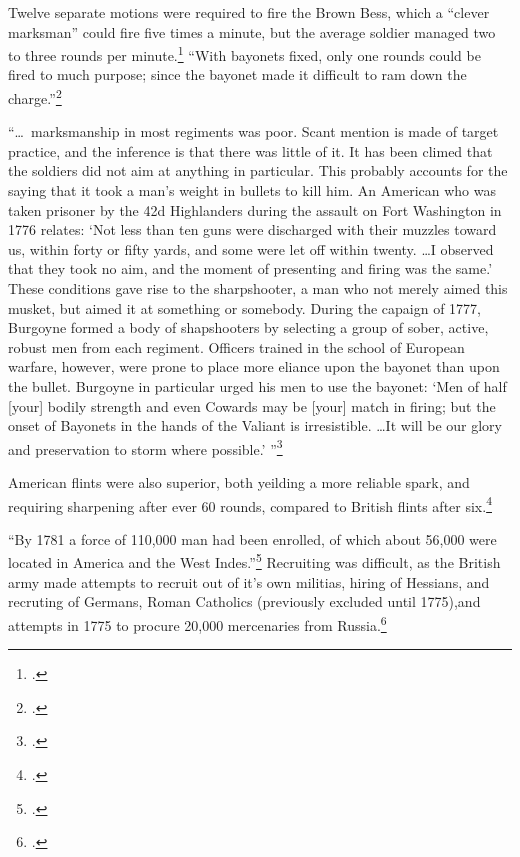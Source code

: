 Twelve separate motions were required to fire the Brown Bess, which a ``clever
marksman'' could fire five times a minute, but the average soldier managed two
to three rounds per minute.\footcite[17]{curtis_org_1972} ``With bayonets fixed,
only one rounds could be fired to much purpose; since the bayonet made it
difficult to ram down the charge.''\footcite[17]{curtis_org_1972}


``\ldots~marksmanship in most regiments was poor. Scant mention is made of target
practice, and the inference is that there was little of it. It has been climed
that the soldiers did not aim at anything in particular. This probably accounts
for the saying that it took a man's weight in bullets to kill him. An American
who was taken prisoner by the 42d Highlanders during the assault on Fort
Washington in 1776 relates: `Not less than ten guns were discharged with their
muzzles toward us, within forty or fifty yards, and some were let off within
twenty. \ldots I observed that they took no aim, and the moment of presenting
and firing was the same.' These conditions gave rise to the sharpshooter, a man
who not merely aimed this musket, but aimed it at something or somebody. During
the capaign of 1777, Burgoyne formed a body of shapshooters by selecting a group
of sober, active, robust men from each regiment. Officers trained in the school
of European warfare, however, were prone to place more eliance upon the bayonet
than upon the bullet. Burgoyne in particular urged his men to use the bayonet:
`Men of half [your] bodily strength and even Cowards may be [your] match in
firing; but the onset of Bayonets in the hands of the Valiant is irresistible.
\ldots It will be our glory and preservation to storm where possible.'
''\footcite[20-21]{curtis_org_1972}

American flints were also superior, both yeilding a more reliable spark, and
requiring sharpening after ever 60 rounds, compared to British flints after
six.\footcite[21]{curtis_org_1972}


``By 1781 a force of 110,000 man had been enrolled, of which about 56,000 were
located in America and the West Indes.''\footcite[51]{curtis_org_1972} Recruiting
was difficult, as the British army made attempts to recruit out of it's own
militias, hiring of Hessians, and recruting of Germans, Roman Catholics
(previously excluded until 1775),and attempts in 1775 to procure 20,000
mercenaries from Russia.\footcite[52]{curtis_org_1972} 



